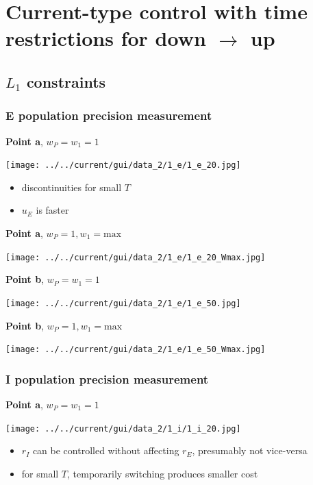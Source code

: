 \documentclass[]{article}
\begin{document}
\section{Current-type control with time restrictions for down $\rightarrow$ up}

\subsection{$L_1$ constraints}

\subsubsection{E population precision measurement}

\textbf{Point a}, $w_P = w_1 = 1$

\texttt{[image: ../../current/gui/data\_2/1\_e/1\_e\_20.jpg]}

\begin{itemize}
	\item discontinuities for small $T$
	\item $u_E$ is faster 
\end{itemize}
\newpage

\textbf{Point a}, $w_P = 1, w_1 = \text{max}$

\texttt{[image: ../../current/gui/data\_2/1\_e/1\_e\_20\_Wmax.jpg]}
\newpage

\textbf{Point b}, $w_P = w_1 = 1$

\texttt{[image: ../../current/gui/data\_2/1\_e/1\_e\_50.jpg]}
\newpage

\textbf{Point b}, $w_P = 1, w_1 = \text{max}$

\texttt{[image: ../../current/gui/data\_2/1\_e/1\_e\_50\_Wmax.jpg]}
\newpage

\subsubsection{I population precision measurement}

\textbf{Point a}, $w_P = w_1 = 1$

\texttt{[image: ../../current/gui/data\_2/1\_i/1\_i\_20.jpg]}

\begin{itemize}
	\item $r_I$ can be controlled without affecting $r_E$, presumably not vice-versa
	\item for small $T$, temporarily switching produces smaller cost
\end{itemize}
\end{document}
